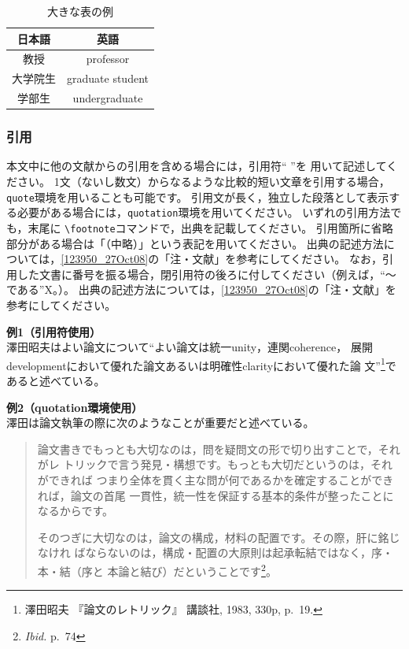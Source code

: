 \documentclass[b5paper,10pt,twocolumn,tombow]{jarticle}
\begin{document}
\begin{table}[tb]
  \centering
  \caption{大きな表の例}
  \begin{tabular}{cc}
    \toprule
    日本語 & 英語 \\
    \midrule
    教授 & professor \\
    大学院生 & graduate student \\
    学部生 & undergraduate \\
    \bottomrule
  \end{tabular}
\end{table}


\subsubsection{引用}
本文中に他の文献からの引用を含める場合には，引用符`` ''を
用いて記述してください。
1文（ないし数文）からなるような比較的短い文章を引用する場合，\texttt{quote}環境を用いることも可能です。
引用文が長く，独立した段落として表示する必要がある場合には，\texttt{quotation}環境を用いてください。
いずれの引用方法でも，末尾に
\verb|\footnote|コマンドで，出典を記載してください。
引用箇所に省略部分がある場合は「（中略）」という表記を用いてください。
出典の記述方法については，\ref{123950_27Oct08}の「注・文献」を参考にしてください。
なお，引用した文書に番号を振る場合，閉引用符の後ろに付してください（例えば，``～である''X。）。
出典の記述方法については，\ref{123950_27Oct08}の「注・文献」を参考にしてください。

\noindent{}\textbf{例1（引用符使用）}\\
澤田昭夫はよい論文について``よい論文は統一unity，連関coherence，
展開developmentにおいて優れた論文あるいは明確性clarityにおいて優れた論
文''\footnote{澤田昭夫 『論文のレトリック』 講談社, 1983, 330p, p.~19.}であると述べている。

\noindent{}\textbf{例2（quotation環境使用）}\\
澤田は論文執筆の際に次のようなことが重要だと述べている。
\begin{quotation}
  論文書きでもっとも大切なのは，問を疑問文の形で切り出すことで，それがレ
  トリックで言う発見・構想です。もっとも大切だというのは，それができれば
  つまり全体を貫く主な問が何であるかを確定することができれば，論文の首尾
  一貫性，統一性を保証する基本的条件が整ったことになるからです。

  そのつぎに大切なのは，論文の構成，材料の配置です。その際，肝に銘じなけれ
  ばならないのは，構成・配置の大原則は起承転結ではなく，序・本・結（序と
  本論と結び）だということです\footnote{\textit{Ibid.} p.~74}。
\end{quotation}
\end{document}
